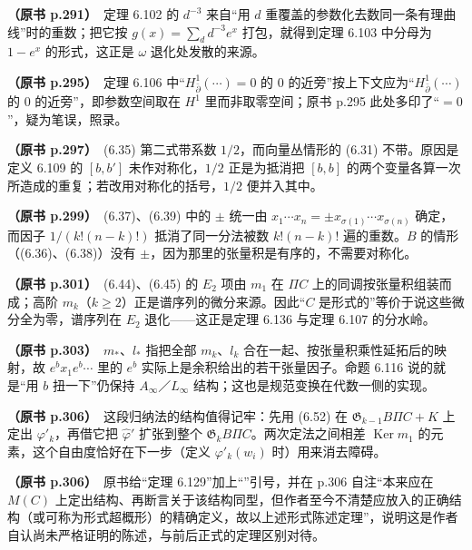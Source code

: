 \noindent \textbf{（原书 p.291）}\ 定理 6.102 的 $d^{-3}$ 来自“用 $d$ 重覆盖的参数化去数同一条有理曲线”时的重数；把它按 $g(x)=\sum_dd^{-3}e^x$ 打包，就得到定理 6.103 中分母为 $1-e^x$ 的形式，这正是 $\omega$ 退化处发散的来源。\par\smallskip

\noindent \textbf{（原书 p.295）}\ 定理 6.106 中“$H^{1}_{\bar\partial}(\cdots)=0$ 的 0 的近旁”按上下文应为“$H^{1}_{\bar\partial}(\cdots)$ 的 0 的近旁”，即参数空间取在 $H^1$ 里而非取零空间；原书 p.295 此处多印了“$=0$”，疑为笔误，照录。\par\smallskip

\noindent \textbf{（原书 p.297）}\ (6.35) 第二式带系数 $1/2$，而向量丛情形的 (6.31) 不带。原因是定义 6.109 的 $[b,b']$ 未作对称化，$1/2$ 正是为抵消把 $[b,b]$ 的两个变量各算一次所造成的重复；若改用对称化的括号，$1/2$ 便并入其中。\par\smallskip

\noindent \textbf{（原书 p.299）}\ (6.37)、(6.39) 中的 $\pm$ 统一由 $x_1\cdots x_n=\pm x_{\sigma(1)}\cdots x_{\sigma(n)}$ 确定，而因子 $1/(k!(n-k)!)$ 抵消了同一分法被数 $k!(n-k)!$ 遍的重数。$B$ 的情形（(6.36)、(6.38)）没有 $\pm$，因为那里的张量积是有序的，不需要对称化。\par\smallskip

\noindent \textbf{（原书 p.301）}\ (6.44)、(6.45) 的 $E_2$ 项由 $m_1$ 在 $\Pi C$ 上的同调按张量积组装而成；高阶 $m_k$（$k\ge2$）正是谱序列的微分来源。因此“$C$ 是形式的”等价于说这些微分全为零，谱序列在 $E_2$ 退化——这正是定理 6.136 与定理 6.107 的分水岭。\par\smallskip

\noindent \textbf{（原书 p.303）}\ $m_*$、$l_*$ 指把全部 $m_k$、$l_k$ 合在一起、按张量积乘性延拓后的映射，故 $e^bx_1e^b\cdots$ 里的 $e^b$ 实际上是余积给出的若干张量因子。命题 6.116 说的就是“用 $b$ 扭一下”仍保持 $A_{\infty}$／$L_{\infty}$ 结构；这也是规范变换在代数一侧的实现。\par\smallskip

\noindent \textbf{（原书 p.306）}\ 这段归纳法的结构值得记牢：先用 (6.52) 在 $\mathfrak{G}_{k-1}B\Pi C+K$ 上定出 $\varphi'_k$，再借它把 $\hat\varphi'$ 扩张到整个 $\mathfrak{G}_kB\Pi C$。两次定法之间相差 $\operatorname{Ker}m_1$ 的元素，这个自由度恰好在下一步（定义 $\varphi'_k(w_i)$ 时）用来消去障碍。\par\smallskip

\noindent \textbf{（原书 p.306）}\ 原书给“定理 6.129”加上“”引号，并在 p.306 自注“本来应在 $M(C)$ 上定出结构、再断言关于该结构同型，但作者至今不清楚应放入的正确结构（或可称为形式超概形）的精确定义，故以上述形式陈述定理”，说明这是作者自认尚未严格证明的陈述，与前后正式的定理区别对待。\par\smallskip

